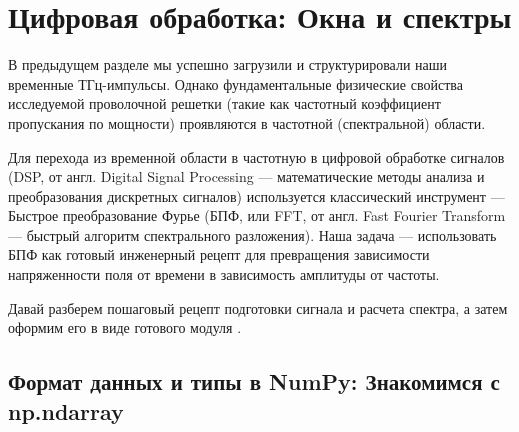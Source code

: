 
\section{Цифровая обработка: Окна и спектры}\label{sec:processing}

В предыдущем разделе мы успешно загрузили и структурировали наши временные ТГц-импульсы. Однако фундаментальные физические свойства исследуемой проволочной решетки (такие как частотный коэффициент пропускания по мощности) проявляются в частотной (спектральной) области. 

Для перехода из временной области в частотную в цифровой обработке сигналов (DSP, от англ. Digital Signal Processing --- математические методы анализа и преобразования дискретных сигналов) используется классический инструмент — Быстрое преобразование Фурье (БПФ, или FFT, от англ. Fast Fourier Transform --- быстрый алгоритм спектрального разложения). Наша задача — использовать БПФ как готовый инженерный рецепт для превращения зависимости напряженности поля от времени в зависимость амплитуды от частоты.


Давай разберем пошаговый рецепт подготовки сигнала и расчета спектра, а затем оформим его в виде готового модуля .

\subsection{Формат данных и типы в NumPy: Знакомимся с np.ndarray}

